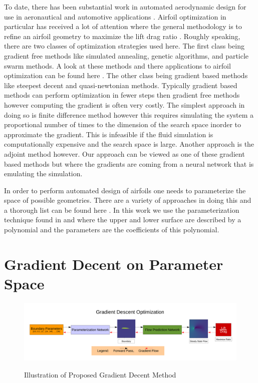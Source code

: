 \documentclass{article} %
\begin{document}
To date, there has been substantial work in automated aerodynamic design for use in aeronautical and automotive applications \cite{ando2010automotive} \cite{demultiplexer}. Airfoil optimization in particular has received a lot of attention where the general methodology is to refine an airfoil geometry to maximize the lift drag ratio \cite{drela1998pros}. Roughly speaking, there are two classes of optimization strategies used here. The first class being gradient free methods like simulated annealing, genetic algorithms, and particle swarm methods. A look at these methods and there applications to airfoil optimization can be found here \cite{mukesh2012application}. The other class being gradient based methods like steepest decent and quasi-newtonian methods. Typically gradient based methods can perform optimization in fewer steps then gradient free methods however computing the gradient is often very costly. The simplest approach in doing so is finite difference method however this requires simulating the system a proportional number of times to the dimension of the search space inorder to approximate the gradient. This is infeasible if the fluid simulation is computationally expensive and the search space is large. Another approach is the adjoint method however. Our approach can be viewed as one of these gradient based methods but where the gradients are coming from a neural network that is emulating the simulation.

In order to perform automated design of airfoils one needs to parameterize the space of possible geometries. There are a variety of approaches in doing this and a thorough list can be found here \cite{salunke2014airfoil}. In this work we use the parameterization technique found in \cite{lane2009surface} and \cite{hilton2007universal} where the upper and lower surface are described by a polynomial and the parameters are the coefficients of this polynomial.

\section{Gradient Decent on Parameter Space}

\begin{figure}[h]
\begin{center}
\includegraphics[scale=0.34]{./gradient_descent_optimization.pdf}
\label{gradient_descent_optimization}
\end{center}
\caption{Illustration of Proposed Gradient Decent Method}
\end{figure}
\end{document}
